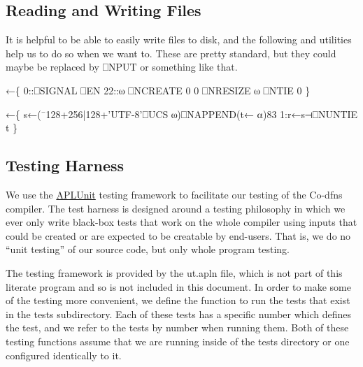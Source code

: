 \documentclass{article}%
\begin{document}
\subsection{Reading and Writing Files}

It is helpful to be able to easily write files to disk, and the
following {\Tt{}\nwendquote} and {\Tt{}\nwendquote} utilities help us to do so when we
want to.
These are pretty standard, but they could maybe be replaced by
{\Tt{}⎕NPUT\nwendquote} or something like that.

\nwenddocs{}\endmoddef\nwstartdeflinemarkup{}\nwenddeflinemarkup
{}←\{
        0::⎕SIGNAL ⎕EN
        22::⍵ ⎕NCREATE 0
        0 ⎕NRESIZE ⍵ ⎕NTIE 0
\}

←\{
        s←(¯128+256|128+'UTF-8'⎕UCS ⍵)⎕NAPPEND(t← ⍺)83
        1:r←s⊣⎕NUNTIE t
\}
\eatline
{}\nwendcode{}\nwdocspar

\subsection{Testing Harness}

We use the \href{https://github.com/Co-dfns/APLUnit}{APLUnit}
testing framework to facilitate our testing of the Co-dfns compiler.
The test harness is designed around a testing philosophy in which we
ever only write black-box tests that work on the whole compiler
using inputs that could be created or are expected to be creatable
by end-users.
That is, we do no ``unit testing'' of our source code,
but only whole program testing.

The testing framework is provided by the {\Tt{}ut.apln\nwendquote} file,
which is not part of this literate program and so is not included in
this document.
In order to make some of the testing more convenient,
we define the function {\Tt{}\nwendquote} to run the tests
that exist in the {\Tt{}tests{\nwbackslash}\nwendquote} subdirectory.
Each of these tests has a specific number which defines the test,
and we refer to the tests by number when running them.
Both of these testing functions assume that we are running inside
of the {\Tt{}tests{\nwbackslash}\nwendquote} directory or one configured identically to it.
\end{document}
